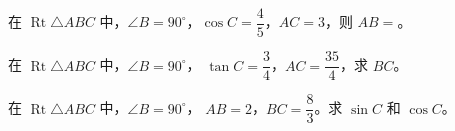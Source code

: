 \documentclass{exam-zh}
\begin{document}
\begin{question}[points=4]
  在 $\operatorname{Rt}\triangle ABC$ 中，$\angle B=90^\circ$，$\cos C=\dfrac45$，$AC=3$，则 $AB=$\fillin。
  
\end{question}



\begin{problem}[points=4]
    在 $\operatorname{Rt}\triangle ABC$ 中，$\angle B=90^\circ$，
$\tan C=\dfrac34$，$AC=\dfrac{35}{4}$，求 $BC$。

    
  \answerarea[28mm]
\end{problem}



\begin{problem}[points=4]
    在 $\operatorname{Rt}\triangle ABC$ 中，$\angle B=90^\circ$，
$AB=2$，$BC=\dfrac83$。求 $\sin C$ 和 $\cos C$。

    
  \answerarea[34mm]
\end{problem}
\end{document}
